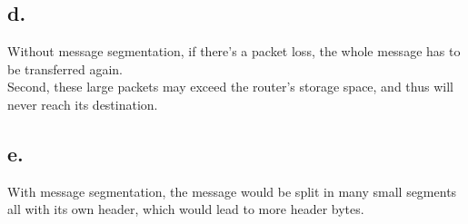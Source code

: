 \documentclass[11pt,a4paper]{article}
\begin{document}
\subsection{d.}
Without message segmentation, if there's a packet loss, the whole message has to be transferred again. \\
Second, these large packets may exceed the router's storage space, and thus will never reach its destination.

\subsection{e.}
With message segmentation, the message would be split in many small segments all with its own header, which would lead to 
more header bytes.
 
\end{document}
